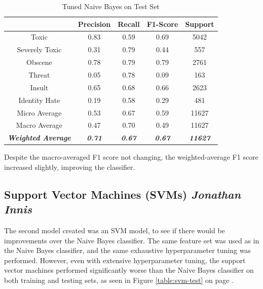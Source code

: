 \documentclass{article}
\begin{document}
{{	  \begin{table}[h!]
		  \centering
		  \begin{tabular}{|c|| c c c c|}
			  \hline
			                                     & Precision              & Recall                 & F1-Score               & Support                 \\ [0.5ex]
			  \hline\hline
			  Toxic                              & 0.83                   & 0.59                   & 0.69                   & 5042                    \\
			  Severely Toxic                     & 0.31                   & 0.79                   & 0.44                   & 557                     \\
			  Obscene                            & 0.78                   & 0.79                   & 0.79                   & 2761                    \\
			  Threat                             & 0.05                   & 0.78                   & 0.09                   & 163                     \\
			  Insult                             & 0.65                   & 0.68                   & 0.66                   & 2623                    \\
			  Identity Hate                      & 0.19                   & 0.58                   & 0.29                   & 481                     \\
			  \hline\hline
			  Micro Average                      & 0.53                   & 0.67                   & 0.59                   & 11627                   \\
			  Macro Average                      & 0.47                   & 0.70                   & 0.49                   & 11627                   \\
			  \textit{\textbf{Weighted Average}} & \textit{\textbf{0.71}} & \textit{\textbf{0.67}} & \textit{\textbf{0.67}} & \textit{\textbf{11627}} \\

			  \hline
		  \end{tabular}
		  \caption{Tuned Naive Bayes on Test Set}
		  \label{table:nb-test}
	  \end{table}

	  Despite the macro-averaged F1 score not changing, the weighted-average F1
	  score increased slightly, improving the classifier.
  }
  \subsection{Support Vector Machines (SVMs) \textit{Jonathan Innis}}{
	  The second model created was an SVM model, to see if there would be
	  improvements over the Naive Bayes classifier. The same feature set was used
	  as in the Naive Bayes classifier, and the same exhaustive hyperparameter
	  tuning was performed. However, even with extensive hyperparameter tuning,
	  the support vector machines performed significantly worse than the Naive
	  Bayes classifier on both training and testing sets, as seen in Figure
	  \ref{table:svm-test} on page \pageref{table:svm-test}.

}}
\end{document}
